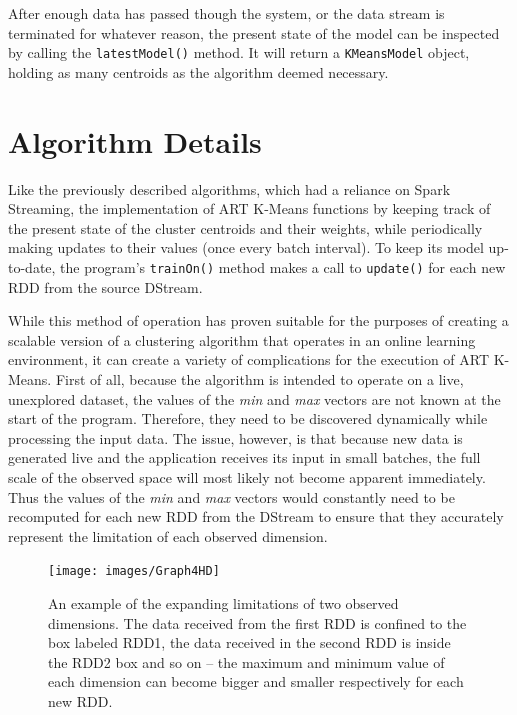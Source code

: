 \documentclass{l4proj}
\begin{document}
After enough data has passed though the system, or the data stream is terminated for whatever reason, the present state of the model can be inspected by calling the \texttt{latestModel()} method. It will return a \texttt{KMeansModel} object, holding as many centroids as the algorithm deemed necessary.

\section{Algorithm Details}

Like the previously described algorithms, which had a reliance on Spark Streaming, the implementation of ART K-Means functions by keeping track of the present state of the cluster centroids and their weights, while periodically making updates to their values (once every batch interval). To keep its model up-to-date, the program's \texttt{trainOn()} method makes a call to \texttt{update()} for each new RDD from the source DStream. 

While this method of operation has proven suitable for the purposes of creating a scalable version of a clustering algorithm that operates in an online learning environment, it can create a variety of complications for the execution of ART K-Means. First of all, because the algorithm is intended to operate on a live, unexplored dataset, the values of the \textit{min} and \textit{max} vectors are not known at the start of the program. Therefore, they need to be discovered dynamically while processing the input data. The issue, however, is that because new data is generated live and the application receives its input in small batches, the full scale of the observed space will most likely not become apparent immediately. Thus the values of the \textit{min} and \textit{max} vectors would constantly need to be recomputed for each new RDD from the DStream to ensure that they accurately represent the limitation of each observed dimension.\\

\begin{figure}[H]
	\centering
    \texttt{[image: images/Graph4HD]}
    \caption{An example of the expanding limitations of two observed dimensions. The data received from the first RDD is confined to the box labeled RDD1, the data received in the second RDD is inside the RDD2 box and so on -- the maximum and minimum value of each dimension can become bigger and smaller respectively for each new RDD.} 
    \label{minMaxgraph}
\end{figure}
\end{document}
